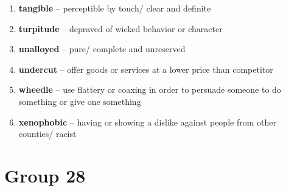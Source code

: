 \begin{enumerate}[wide,labelindent=0pt]
\item \textbf{tangible} -- perceptible by touch/ clear and definite
\item \textbf{turpitude} -- depraved of wicked behavior or character
\item \textbf{unalloyed} -- pure/ complete and unreserved
\item \textbf{undercut} -- offer goods or services at a lower price than competitor
\item \textbf{wheedle} -- use flattery or coaxing in order to persuade someone to do something or give one something
\item \textbf{xenophobic} -- having or showing a dislike against people from other counties/ racist
\end{enumerate}

\newpage
\section{Group 28}

